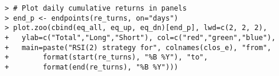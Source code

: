 \documentclass[10pt]{beamer}\usepackage[]{graphicx}\usepackage[]{color}
\makeatletter
\newenvironment{kframe}{%
 \def\at@end@of@kframe{}%
 \ifinner\ifhmode%
  \def\at@end@of@kframe{\end{minipage}}%
  \begin{minipage}{\columnwidth}%
 \fi\fi%
 \def\FrameCommand##1{\hskip\@totalleftmargin \hskip-\fboxsep
 \colorbox{shadecolor}{##1}\hskip-\fboxsep
     \hskip-\linewidth \hskip-\@totalleftmargin \hskip\columnwidth}%
 \MakeFramed {\advance\hsize-\width
   \@totalleftmargin\z@ \linewidth\hsize
   \@setminipage}}%
 {\par\unskip\endMakeFramed%
 \at@end@of@kframe}
\newenvironment{knitrout}{}{} %
\makeatother
\begin{document}
\begin{frame}[fragile,t]{\subsecname}
\begin{block}{}
\begin{columns}[T]
\begin{knitrout}
\color{fgcolor}\begin{kframe}
\begin{verbatim}
> # Plot daily cumulative returns in panels
> end_p <- endpoints(re_turns, on="days")
> plot.zoo(cbind(eq_all, eq_up, eq_dn)[end_p], lwd=c(2, 2, 2),
+   ylab=c("Total","Long","Short"), col=c("red","green","blue"),
+   main=paste("RSI(2) strategy for", colnames(clos_e), "from",
+        format(start(re_turns), "%B %Y"), "to",
+        format(end(re_turns), "%B %Y")))
\end{verbatim}
\end{kframe}
\end{knitrout}
  \end{columns}
\end{block}

\end{frame}


\end{document}
